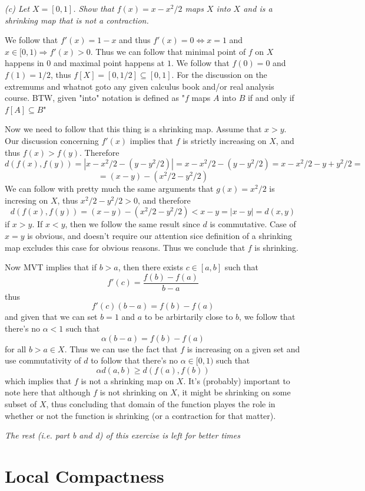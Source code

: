 \documentclass[11pt,oneside,titlepage]{book}
\DeclareMathOperator \lra {\Leftrightarrow}
\DeclareMathOperator \ra {\Rightarrow}
\begin{document}
\textit{(c) Let $X = [0, 1]$. Show that $f(x) = x - x^2/2$ maps $X$ into $X$ and is a shrinking map
  that is not a contraction.}

We follow that $f'(x) = 1 - x$ and thus $f'(x) = 0 \lra x = 1$ and $x \in [0, 1) \ra f'(x) > 0$.
Thus we can follow that minimal point of $f$ on $X$ happens in $0$ and maximal point happens at
$1$. We follow that $f(0) = 0$ and $f(1) = 1/2$, thus $f[X] = [0, 1/2] \subseteq [0, 1]$.
For the discussion on the extremums and whatnot goto any given calculus book and/or
real analysis course. BTW, given "into" notation is defined as "$f$ maps $A$ into $B$
if and only if $f[A] \subseteq B$"

Now we need to follow that this thing is a shrinking map. Assume that $x > y$. Our discussion
concerning $f'(x)$ implies that $f$ is strictly increasing on $X$, and thus $f(x) > f(y)$. Therefore
$$d(f(x), f(y)) = |x - x^2/2 - (y - y^2/2)| = x - x^2/2 - (y - y^2/2) = x - x^2/2 - y + y^2/2 = $$
$$ = (x - y) - (x^2/2 - y^2/2)$$
We can follow with pretty much the same arguments that $g(x) = x^2/2$ is incresing on
$X$, thus $x^2/2 - y^2/2 > 0$, and therefore
$$d(f(x), f(y)) = (x - y) - (x^2/2 - y^2/2) < x - y = |x - y| = d(x, y)$$
if $x > y$. If $x < y$, then we follow the same result since $d$ is commutative. Case of $x = y$
is obvious, and doesn't require our attention sice definition of a shrinking map excludes this
case for obvious reasons. Thus we conclude that $f$ is shrinking.

Now MVT implies that if $b > a$, then there exists $c \in [a, b]$ such that
$$f'(c) = \frac{f(b) - f(a)}{b - a}$$
thus
$$f'(c)(b - a) = f(b) - f(a)$$
and given that we can set $b = 1$ and $a$ to be arbirtarily close to $b$,  we follow that
there's no $\alpha < 1$ such that
$$\alpha(b - a) = f(b) - f(a)$$
for all $b > a \in X$.  Thus we can use the fact that $f$ is increasing on a given set and
use commutativity of $d$ to follow that there's no $\alpha \in [0, 1)$ such that 
$$\alpha d(a, b) \geq d(f(a),f(b))$$
which implies that $f$ is not a shrinking map on $X$. It's (probably) important to note
here that although $f$ is not shrinking on $X$, it might be shrinking on some subset of $X$,
thus concluding that domain of the function playes the role in whether or not the function
is shrinking (or a contraction for that matter).

\textit{The rest (i.e. part b and d) of this exercise is left for better times}

\section{Local Compactness}
\end{document}
